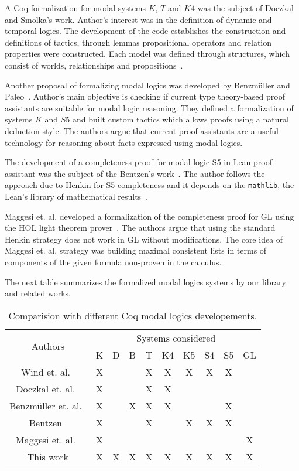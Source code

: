 \documentclass[sigconf,anonymous]{acmart}
\begin{document}
A Coq formalization for modal systems $K$, $T$ and $K4$ was the subject of 
Doczkal and Smolka's work. Author's interest was in the definition of dynamic
and temporal logics. The development of the code establishes the construction
and definitions of tactics, through lemmas propositional operators and relation
properties were constructed. Each model was defined through structures, which
consist of worlds, relationships and propositions~\cite{saarland}.

Another proposal of formalizing modal logics was developed by Benzmüller and
Paleo~\cite{Chris_Bruno}. Author's main objective is checking if current
type theory-based proof assistants are suitable for modal logic reasoning.
They defined a formalization of systems $K$ and $S5$ and built custom tactics
which allows proofs using a natural deduction style.
The authors argue that current proof assistants are a useful technology for
reasoning about facts expressed using modal logics. 

The development of a completeness proof for modal logic S5 in Lean proof
assistant was the subject of the Bentzen's work~\cite{Bentzen2021}. The author
follows the approach due to Henkin for S5 completeness and it depends on
the \texttt{mathlib}, the Lean's library of mathematical results~\cite{mathlib20}. 

Maggesi et. al. developed a formalization of the completeness proof for GL using
the HOL light theorem prover~\cite{Maggesi21}. The authors argue that using the
standard Henkin strategy does not work in GL without modifications. The core idea of
Maggesi et. al. strategy was building maximal consistent lists in terms of
components of the given formula non-proven in the calculus.

The next table summarizes the formalized modal logics systems by our library
and related works.
\vspace{0.5cm} {
  \begin{table}[H]
    \begin{tabular}{|c|c|c|c|c|c|c|c|c|c|}
      \hline
      \multirow{2}{*}{Authors} & \multicolumn{9}{c|}{Systems considered} \\ \cline{2-10} 
                               & K & D & B & T & K4 & K5 & S4 & S5 & GL\\ \hline
      Wind et. al.~\cite{dewind}     & X &   &   & X & X  & X  & X  &  X & \\ \hline
      Doczkal et. al.~\cite{saarland}   & X &   &   & X & X  &    &    &  &  \\ \hline
      Benzmüller et. al.~\cite{Chris_Bruno}& X &   & X & X &  X &    &    & X &  \\ \hline
      Bentzen~\cite{Bentzen2021} & X & & & X & & X & X & X & \\ \hline
      Maggesi et. al.~\cite{Maggesi21} & X & & & & & & & & X \\ \hline
      This work         & X & X & X & X & X  &  X &  X & X  & X \\ \hline
    \end{tabular}
    \centering
    \caption{Comparision with different Coq modal logics developements.}
    \label{tab:comparacao_trabalhos_rel}
  \end{table}
}
\end{document}

